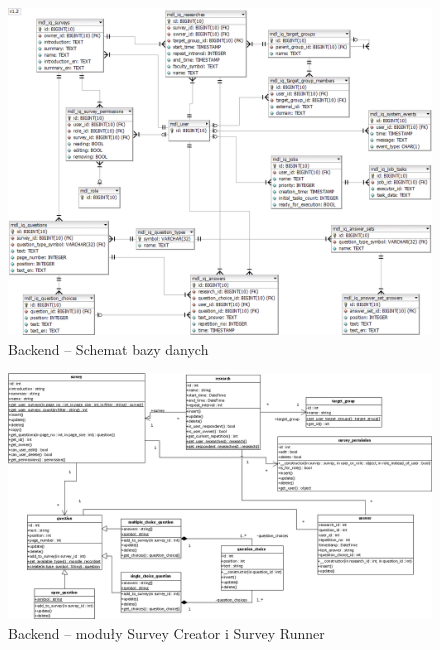 \newpage
\begin{landscape}

\begin{figure}[!th]
\centering\includegraphics[width=1.25\textheight]{figures/iQuest_Database.png}
\caption{Backend -- Schemat bazy danych}\label{rys:iquest-db}
\end{figure}

\begin{figure}[!th]
\centering\includegraphics[width=1.25\textheight]{figures/Survey_Creator_Survey_Runner.png}
\caption{Backend -- moduły Survey Creator i Survey Runner}\label{rys:iquest-backend}
\end{figure}


\end{landscape}

